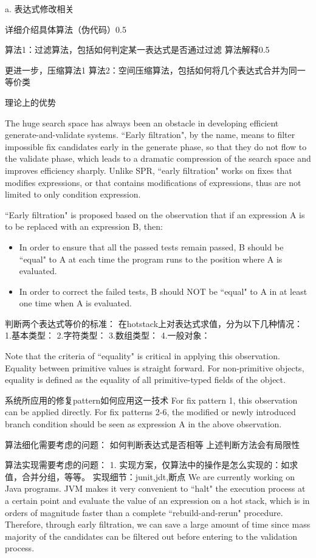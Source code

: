 a. 表达式修改相关

详细介绍具体算法（伪代码）0.5

算法1：过滤算法，包括如何判定某一表达式是否通过过滤
算法解释0.5

更进一步，压缩算法1
算法2：空间压缩算法，包括如何将几个表达式合并为同一等价类

理论上的优势

The huge search space has always been an obstacle in developing efficient generate-and-validate systems. ``Early filtration", by the name, means to filter impossible fix candidates early in the generate phase, so that they do not flow to the validate phase, which leads to a dramatic compression of the search space and improves efficiency sharply. Unlike SPR\cite{Long:2015:SPR:2786805.2786811}, ``early filtration" works on fixes that modifies expressions, or that contains modifications of expressions, thus are not limited to only condition expression.

``Early filtration" is proposed based on the observation that if an expression A is to be replaced with an expression B, then:
\begin{itemize}	
	\item{In order to ensure that all the passed tests remain passed, B should be ``equal" to A at each time the program runs to the position where A is evaluated.}
	\item{In order to correct the failed tests, B should NOT be ``equal" to A in at least one time when A is evaluated.}
\end{itemize}


判断两个表达式等价的标准：
在hotstack上对表达式求值，分为以下几种情况：
1.基本类型：
2.字符类型：
3.数组类型：
4.一般对象：

Note that the criteria of ``equality" is critical in applying this observation. Equality between primitive values is straight forward. For non-primitive objects, equality is defined as the equality of all primitive-typed fields of the object.


系统所应用的修复pattern如何应用这一技术
For fix pattern 1, this observation can be applied directly. For fix patterns 2-6, the modified or newly introduced branch condition should be seen as expression A in the above observation.


算法细化需要考虑的问题：
如何判断表达式是否相等
上述判断方法会有局限性



算法实现需要考虑的问题：
1. 实现方案，仅算法中的操作是怎么实现的：如求值，合并分组，等等。
实现细节：junit,jdt,断点
We are currently working on Java programs. JVM makes it very convenient to ``halt" the execution process at a certain point and evaluate the value of an expression on a hot stack, which is in orders of magnitude faster than a complete ``rebuild-and-rerun" procedure. Therefore, through early filtration, we can save a large amount of time since mass majority of the candidates can be filtered out before entering to the validation process.

